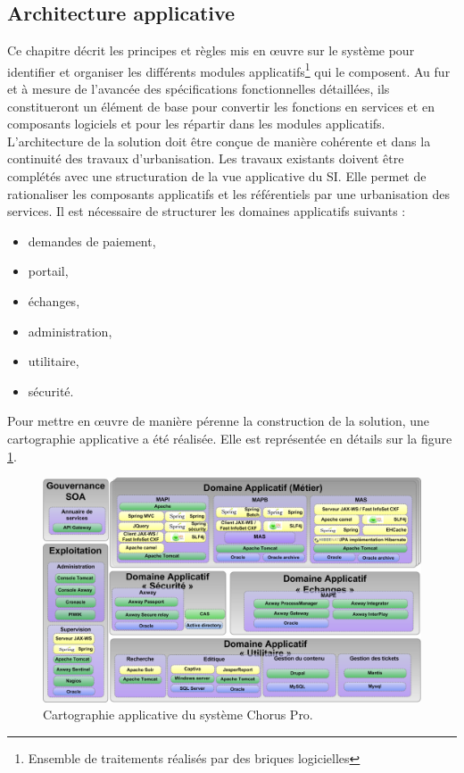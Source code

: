 \documentclass[12pt,a4paper]{article}
\begin{document}
\subsection{Architecture applicative}
Ce chapitre décrit les principes et règles mis en œuvre sur le système pour identifier et organiser les différents modules applicatifs\footnote{Ensemble de traitements réalisés par des briques logicielles} qui le composent. Au fur et à mesure de l’avancée des spécifications fonctionnelles détaillées, ils constitueront un élément de base pour convertir les fonctions en services et en composants logiciels et pour les répartir dans les modules applicatifs. L’architecture de la solution doit être conçue de manière cohérente et dans la continuité des travaux d’urbanisation. Les travaux existants doivent être complétés avec une structuration de la vue applicative du \gls{SI}. Elle permet de rationaliser les composants applicatifs et les référentiels par une urbanisation des services.
\newpage
Il est nécessaire de structurer les domaines applicatifs suivants :
\smallbreak
\begin{itemize}
\item	demandes de paiement,
\item	portail,
\item	échanges,
\item	administration,
\item	utilitaire,
\item	sécurité.
\end{itemize}
\bigbreak
Pour mettre en œuvre de manière pérenne la construction de la solution, une  cartographie applicative a été réalisée. Elle est représentée en détails sur la figure \ref{vueApplicative}.
\medbreak
\begin{figure}[H]
	\begin{center}
		\includegraphics[width=\textwidth, height=\textheight, keepaspectratio]{cartographieApplicative.png}
		\caption{Cartographie applicative du système Chorus Pro.}
		\label{vueApplicative}
	\end{center}
\end{figure}
\end{document}
